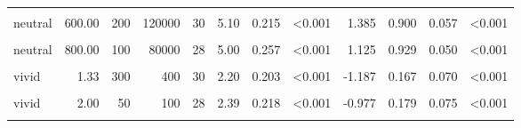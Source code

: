 \documentclass[
]{article}
\begin{document}
\begin{longtable}[t]{lrrrrrrlrrrl}
\hspace{1em}\cellcolor{gray!10}{neutral} & \cellcolor{gray!10}{600.00} & \cellcolor{gray!10}{20} & \cellcolor{gray!10}{12000} & \cellcolor{gray!10}{28} & \cellcolor{gray!10}{5.04} & \cellcolor{gray!10}{0.270} & \cellcolor{gray!10}{<0.001} & \cellcolor{gray!10}{1.096} & \cellcolor{gray!10}{0.893} & \cellcolor{gray!10}{0.061} & \cellcolor{gray!10}{<0.001}\\
\hspace{1em}neutral & 600.00 & 200 & 120000 & 30 & 5.10 & 0.215 & <0.001 & 1.385 & 0.900 & 0.057 & <0.001\\
\hspace{1em}\cellcolor{gray!10}{neutral} & \cellcolor{gray!10}{800.00} & \cellcolor{gray!10}{30} & \cellcolor{gray!10}{24000} & \cellcolor{gray!10}{30} & \cellcolor{gray!10}{5.17} & \cellcolor{gray!10}{0.196} & \cellcolor{gray!10}{<0.001} & \cellcolor{gray!10}{1.583} & \cellcolor{gray!10}{0.933} & \cellcolor{gray!10}{0.047} & \cellcolor{gray!10}{<0.001}\\
\hspace{1em}neutral & 800.00 & 100 & 80000 & 28 & 5.00 & 0.257 & <0.001 & 1.125 & 0.929 & 0.050 & <0.001\\
\hspace{1em}\cellcolor{gray!10}{vivid} & \cellcolor{gray!10}{1.33} & \cellcolor{gray!10}{30} & \cellcolor{gray!10}{40} & \cellcolor{gray!10}{28} & \cellcolor{gray!10}{1.86} & \cellcolor{gray!10}{0.194} & \cellcolor{gray!10}{<0.001} & \cellcolor{gray!10}{-1.630} & \cellcolor{gray!10}{0.071} & \cellcolor{gray!10}{0.050} & \cellcolor{gray!10}{<0.001}\\
\hspace{1em}vivid & 1.33 & 300 & 400 & 30 & 2.20 & 0.203 & <0.001 & -1.187 & 0.167 & 0.070 & <0.001\\
\hspace{1em}\cellcolor{gray!10}{vivid} & \cellcolor{gray!10}{2.00} & \cellcolor{gray!10}{20} & \cellcolor{gray!10}{40} & \cellcolor{gray!10}{30} & \cellcolor{gray!10}{2.37} & \cellcolor{gray!10}{0.165} & \cellcolor{gray!10}{<0.001} & \cellcolor{gray!10}{-1.274} & \cellcolor{gray!10}{0.133} & \cellcolor{gray!10}{0.064} & \cellcolor{gray!10}{<0.001}\\
\hspace{1em}vivid & 2.00 & 50 & 100 & 28 & 2.39 & 0.218 & <0.001 & -0.977 & 0.179 & 0.075 & <0.001\\
\hspace{1em}\cellcolor{gray!10}{vivid} & \cellcolor{gray!10}{3.00} & \cellcolor{gray!10}{10} & \cellcolor{gray!10}{30} & \cellcolor{gray!10}{30} & \cellcolor{gray!10}{2.70} & \cellcolor{gray!10}{0.230} & \cellcolor{gray!10}{0.002} & \cellcolor{gray!10}{-0.647} & \cellcolor{gray!10}{0.267} & \cellcolor{gray!10}{0.084} & \cellcolor{gray!10}{0.016}\\

\end{longtable}
\end{document}

